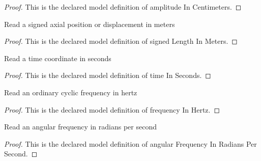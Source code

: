 \begin{proof}
  This is the declared model definition of amplitude In Centimeters.
\end{proof}
\begin{definition}
  \label{def:physics:phyx-mini-0240:phyxminiproblems-problemphyxmini0240-signedlengthinmeters}
  Read a signed axial position or displacement in meters
\end{definition}
\begin{proof}
  This is the declared model definition of signed Length In Meters.
\end{proof}
\begin{definition}
  \label{def:physics:phyx-mini-0240:phyxminiproblems-problemphyxmini0240-timeinseconds}
  Read a time coordinate in seconds
\end{definition}
\begin{proof}
  This is the declared model definition of time In Seconds.
\end{proof}
\begin{definition}
  \label{def:physics:phyx-mini-0240:phyxminiproblems-problemphyxmini0240-frequencyinhertz}
  Read an ordinary cyclic frequency in hertz
\end{definition}
\begin{proof}
  This is the declared model definition of frequency In Hertz.
\end{proof}
\begin{definition}
  \label{def:physics:phyx-mini-0240:phyxminiproblems-problemphyxmini0240-angularfrequencyinradianspersecond}
  Read an angular frequency in radians per second
\end{definition}
\begin{proof}
  This is the declared model definition of angular Frequency In Radians Per Second.
\end{proof}
